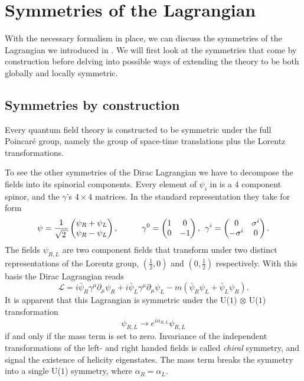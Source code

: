 \section{Symmetries of the Lagrangian} \label{sec-symmetries}

With the necessary formalism in place, we can discuss the symmetries of the
Lagrangian we introduced in . We will first look at the
symmetries that come by construction before delving into possible ways of
extending the theory to be both globally and locally symmetric.

\subsection{Symmetries by construction}

Every quantum field theory is constructed to be symmetric under the full
Poincar\'{e} group, namely the group of space-time translations plus the Lorentz
transformations. 

To see the other symmetries of the Dirac Lagrangian we have to decompose the
fields into its spinorial components. Every element of $\psi_i$ in
 is a $4$ component spinor, and the $\gamma$'s $4 \times 4$
matrices. In the standard representation they take for form
%
\begin{equation}
  \psi = \frac{1}{\sqrt{2}} \begin{pmatrix} \psi_R + \psi_L \\ \psi_R - \psi_L \end{pmatrix}, \hskip1cm
    \gamma^0 = \begin{pmatrix} 1 & 0 \\ 0 & -1 \end{pmatrix}, \hskip1ex
    \gamma^i = \begin{pmatrix} 0 & \sigma^i \\ -\sigma^i & 0 \end{pmatrix}.
\end{equation}
%
The fields $\psi_{R,L}$ are two component fields that transform under two
distinct representations of the Lorentz group, $(\frac{1}{2}, 0)$ and $(0,
\frac{1}{2})$ respectively. With this basis the Dirac Lagrangian reads
%
\begin{equation}
  \mathcal{L} = i \bar{\psi}_R \gamma^{\mu}\partial_{\mu} \psi_R
    + i \bar{\psi}_L \gamma^{\mu}\partial_{\mu} \psi_L
    - m (\bar{\psi}_R\psi_L + \bar{\psi}_L\psi_R).
\end{equation}
%
It is apparent that this Lagrangian is symmetric under the U($1$) $\otimes$ U($1$)
transformation
%
\begin{equation} \label{eq-chiral_transformation}
  \psi_{R,L} \to e^{i \alpha_{R,L}} \psi_{R,L}
\end{equation}
%
if and only if the mass term is set to zero. Invariance of the independent
transformations of the left- and right handed fields is called \emph{chiral}
symmetry, and signal the existence of helicity eigenstates. The mass term breaks
the symmetry into a single U($1$) symmetry, where $\alpha_R = \alpha_L$.

